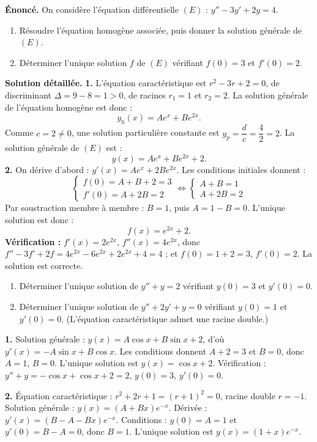 \documentclass[11pt]{article}
\begin{document}
\begin{exoresolu}
\textbf{Énoncé.} On considère l'équation différentielle $(E)$ : $y'' - 3y' + 2y = 4$.
\begin{enumerate}
\item Résoudre l'équation homogène associée, puis donner la solution générale de $(E)$.
\item Déterminer l'unique solution $f$ de $(E)$ vérifiant $f(0) = 3$ et $f'(0) = 2$.
\end{enumerate}
\tcblower
\textbf{Solution détaillée.}
\textbf{1.} L'équation caractéristique est $r^2 - 3r + 2 = 0$, de discriminant $\Delta = 9 - 8 = 1 > 0$, de racines $r_1 = 1$ et $r_2 = 2$. La solution générale de l'équation homogène est donc :
\[ y_h(x) = A e^{x} + B e^{2x}. \]
Comme $c = 2 \neq 0$, une solution particulière constante est $y_p = \dfrac{d}{c} = \dfrac{4}{2} = 2$. La solution générale de $(E)$ est :
\[ y(x) = A e^{x} + B e^{2x} + 2. \]
\textbf{2.} On dérive d'abord : $y'(x) = A e^{x} + 2B e^{2x}$. Les conditions initiales donnent :
\[
\begin{cases}
f(0) = A + B + 2 = 3 \\
f'(0) = A + 2B = 2
\end{cases}
\iff
\begin{cases}
A + B = 1 \\
A + 2B = 2
\end{cases}
\]
Par soustraction membre à membre : $B = 1$, puis $A = 1 - B = 0$. L'unique solution est donc :
\[ f(x) = e^{2x} + 2. \]
\textbf{Vérification :} $f'(x) = 2e^{2x}$, $f''(x) = 4e^{2x}$, donc $f'' - 3f' + 2f = 4e^{2x} - 6e^{2x} + 2e^{2x} + 4 = 4$ ; et $f(0) = 1 + 2 = 3$, $f'(0) = 2$. La solution est correcte.
\end{exoresolu}

\begin{exercice}
\begin{enumerate}
\item Déterminer l'unique solution de $y'' + y = 2$ vérifiant $y(0) = 3$ et $y'(0) = 0$.
\item Déterminer l'unique solution de $y'' + 2y' + y = 0$ vérifiant $y(0) = 1$ et $y'(0) = 0$. (L'équation caractéristique admet une racine double.)
\end{enumerate}
\end{exercice}

\begin{corrige}[Exercice]
\textbf{1.} Solution générale : $y(x) = A\cos x + B\sin x + 2$, d'où $y'(x) = -A\sin x + B\cos x$. Les conditions donnent $A + 2 = 3$ et $B = 0$, donc $A = 1$, $B = 0$. L'unique solution est $y(x) = \cos x + 2$. Vérification : $y'' + y = -\cos x + \cos x + 2 = 2$, $y(0) = 3$, $y'(0) = 0$.

\textbf{2.} Équation caractéristique : $r^2 + 2r + 1 = (r+1)^2 = 0$, racine double $r = -1$. Solution générale : $y(x) = (A + Bx)e^{-x}$. Dérivée : $y'(x) = (B - A - Bx)e^{-x}$. Conditions : $y(0) = A = 1$ et $y'(0) = B - A = 0$, donc $B = 1$. L'unique solution est $y(x) = (1 + x)e^{-x}$.
\end{corrige}
\end{document}

